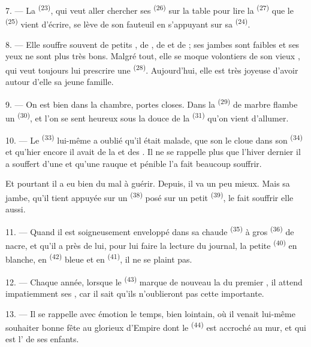 7. --- La  \textsuperscript{(23)}, qui veut aller chercher
ses  \textsuperscript{(26)} sur la table pour lire la
 \textsuperscript{(27)} que le 
\textsuperscript{(25)} vient d'écrire, se lève de son fauteuil en s'appuyant
sur sa  \textsuperscript{(24)}.

8. --- Elle souffre souvent de petits , de ,
de  et de ; ses jambes sont faibles et ses
yeux ne sont plus très bons. Malgré tout, elle se moque volontiers de son vieux
, qui veut toujours lui prescrire une 
\textsuperscript{(28)}. Aujourd'hui, elle est très joyeuse d'avoir autour
d'elle sa jeune famille.

9. --- On est bien dans la chambre, portes closes. Dans la 
\textsuperscript{(29)} de marbre flambe un 
\textsuperscript{(30)}, et l'on se sent heureux sous la douce 
de la  \textsuperscript{(31)} qu'on vient d'allumer.

\VUsaut{4.2mm}
\VUsaut{3.0mm}

10. --- Le  \textsuperscript{(33)} lui-même a oublié qu'il
était malade, que son  le cloue dans son 
\textsuperscript{(34)} et qu'hier encore il avait de la  et des
. Il ne se rappelle plus que l'hiver dernier il a souffert
d'une  et qu'une  rauque et pénible l'a fait
beaucoup souffrir.

Et pourtant il a eu bien du mal à guérir. Depuis, il va un peu mieux. Mais sa
jambe, qu'il tient appuyée sur un  \textsuperscript{(38)} posé
sur un petit  \textsuperscript{(39)}, le fait souffrir elle
aussi.

11. --- Quand il est soigneusement enveloppé dans sa chaude  \textsuperscript{(35)} à gros 
\textsuperscript{(36)} de nacre, et qu'il a près de lui, pour lui faire la
lecture du journal, la petite  \textsuperscript{(40)} en
 blanche, en  \textsuperscript{(42)} bleue et en
 \textsuperscript{(41)}, il ne se plaint pas.

12. --- Chaque année, lorsque le  \textsuperscript{(43)}
marque de nouveau la  du premier , il attend
impatiemment ses , car il sait qu'ils n'oublieront pas
cette  importante.

13. --- Il se rappelle avec émotion le temps, bien lointain, où il venait
lui-même souhaiter bonne fête au glorieux  d'Empire dont le
 \textsuperscript{(44)} est accroché au mur, et qui est
l' de ses enfants.
\VUsaut{6.0mm}
\VUfilet{22mm}
